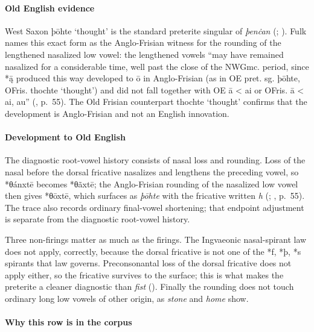 \documentclass[
  british,
  a4paper,
]{article}
\begin{document}
\paragraph{Old English evidence}\label{old-english-evidence-68}

West Saxon {þōhte} `thought' is the standard preterite singular of
\emph{þenċan} (;
). Fulk names
this exact form as the Anglo-Frisian witness for the rounding of the
lengthened nasalized low vowel: the lengthened vowels ``may have
remained nasalized for a considerable time, well past the close of the
NWGmc. period, since *ą̄ produced this way developed to ō in
Anglo-Frisian (as in OE pret. sg. þōhte, OFris. thochte `thought') and
did not fall together with OE ā \textless{} ai or OFris. ā \textless{}
ai, au'' (, p.~55). The Old
Frisian counterpart {thochte} `thought' confirms that the development is
Anglo-Frisian and not an English innovation.

\paragraph{Development to Old
English}\label{development-to-old-english-67}

The diagnostic root-vowel history consists of nasal loss and rounding.
Loss of the nasal before the dorsal fricative nasalizes and lengthens
the preceding vowel, so *θánxtē becomes *θãxtē; the Anglo-Frisian
rounding of the nasalized low vowel then gives *θōxtē, which surfaces as
\emph{þōhte} with the fricative written \emph{h}
(; , p.~55). The trace also records ordinary final-vowel
shortening; that endpoint adjustment is separate from the diagnostic
root-vowel history.

Three non-firings matter as much as the firings. The Ingvaeonic
nasal-spirant law does not apply, correctly, because the dorsal
fricative is not one of the *f, *þ, *s spirants that law governs.
Preconsonantal loss of the dorsal fricative does not apply either, so
the fricative survives to the surface; this is what makes the preterite
a cleaner diagnostic than \emph{fist} (). Finally the rounding does not touch ordinary long low
vowels of other origin, as \emph{stone} and \emph{home} show.

\paragraph{Why this row is in the
corpus}\label{why-this-row-is-in-the-corpus-1}
\end{document}
